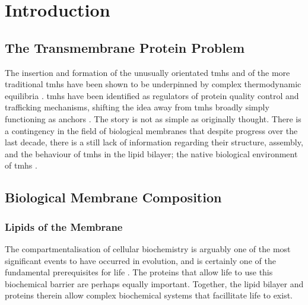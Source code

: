 \chapter{Introduction}


\section{The Transmembrane Protein Problem}

The insertion and formation of the unusually orientated \gls{tmh}s and of the more traditional \gls{tmh}s have been shown to be underpinned by complex thermodynamic equilibria \cite{Cymer2014}. \gls{tmh}s have been identified as regulators of protein quality control and trafficking mechanisms, shifting the idea away from \gls{tmh}s broadly simply functioning as anchors \cite{Hessa2011}. The story is not as simple as originally thought. There is a contingency in the field of biological membranes that despite progress over the last decade, there is a still lack of information regarding their structure, assembly, and the behaviour of \gls{tmh}s in the lipid bilayer; the native biological environment of \gls{tmh}s \cite{Ladokhin2015}.


\section{Biological Membrane Composition}

\subsection{Lipids of the Membrane}

The compartmentalisation of cellular biochemistry is arguably one of the most significant events to have occurred in evolution, and is certainly one of the fundamental prerequisites for life \cite{Koshland2002}.  The proteins that allow life to use this biochemical barrier are perhaps equally important. Together, the lipid bilayer and proteins therein allow complex biochemical systems that facillitate life to exist.

